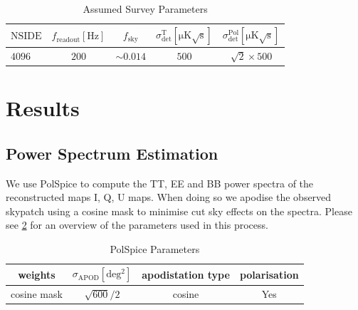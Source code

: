 \documentclass[apj]{emulateapj}
\begin{document}
\begin{table}[tbh] %
\begin{center}
\caption{\label{tab:modelparams} Assumed Survey Parameters}
\small
\begin{tabular}{l c c c c}
$\mathrm{NSIDE}$ & $f_{\mathrm{readout}} [\mathrm{Hz}]$ & $f_{{\mathrm{sky}}}$ & $\sigma^{\mathrm{T}}_{\mathrm{det}} [\mathrm{\mu K \sqrt{s}}]$ & $\sigma^{\mathrm{Pol}}_{\mathrm{det}} [\mathrm{\mu K \sqrt{s}}]$\\
\hline
$4096$ & $200$ & $\sim 0.014$ & $500$ & $\sqrt{2}\times500$\\

\end{tabular}
 \normalsize
\end{center}
\end{table}



\section{Results}
\label{sec:results}

\subsection{Power Spectrum Estimation}
\label{subsec:psestimation}

We use PolSpice to compute the TT, EE and BB power spectra of the reconstructed maps I, Q, U maps. When doing so we apodise the observed skypatch using a cosine mask to minimise cut sky effects on the spectra. Please see \ref{tab:polspiceparams} for an overview of the parameters used in this process.

\begin{table}[tbh]
\begin{center}
\caption{\label{tab:polspiceparams} PolSpice Parameters}
\small
\begin{tabular}{c c c c}
weights & $\sigma_{\mathrm{APOD}} [\mathrm{deg^2}]$ & apodistation type & polarisation \\
\hline
cosine mask & $\sqrt{600}/2$ & cosine & Yes \\

\end{tabular}
 \normalsize
\end{center}
\end{table}
\end{document}
